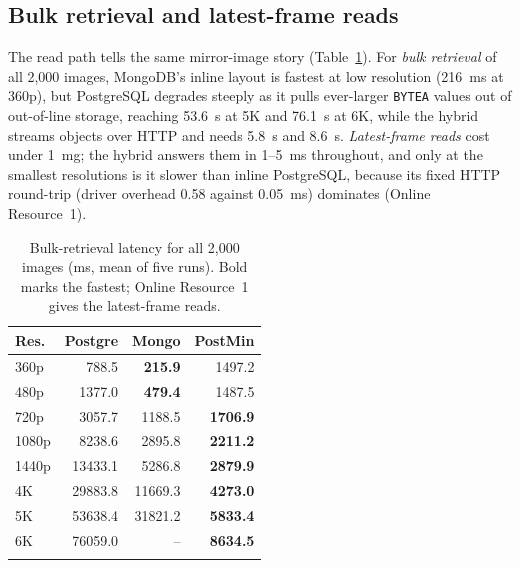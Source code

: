 \documentclass[pdflatex,sn-basic]{sn-jnl}%
\begin{document}
\subsection{Bulk retrieval and latest-frame reads}\label{subsec:retrieval}
The read path tells the same mirror-image story (Table~\ref{tab:read}). For \emph{bulk retrieval} of all 2{,}000 images, MongoDB's inline layout is fastest at low resolution (216~ms at 360p), but PostgreSQL degrades steeply as it pulls ever-larger \texttt{BYTEA} values out of out-of-line storage, reaching 53.6~s at 5K and 76.1~s at 6K, while the hybrid streams objects over HTTP and needs 5.8~s and 8.6~s. \emph{Latest-frame reads} cost under 1~mg; the hybrid answers them in 1--5~ms throughout, and only at the smallest resolutions is it slower than inline PostgreSQL, because its fixed HTTP round-trip (driver overhead 0.58 against 0.05~ms) dominates (Online Resource~1).

\begin{table}[htbp]
\caption{Bulk-retrieval latency for all 2{,}000 images (ms, mean of five runs). Bold marks the fastest; Online Resource~1 gives the latest-frame reads.}\label{tab:read}
\small
\begin{tabular}{@{}lrrr@{}}
\toprule
Res. & Postgre & Mongo & PostMin \\
\midrule
360p  & 788.5 & \textbf{215.9} & 1497.2 \\
480p  & 1377.0 & \textbf{479.4} & 1487.5 \\
720p  & 3057.7 & 1188.5 & \textbf{1706.9} \\
1080p & 8238.6 & 2895.8 & \textbf{2211.2} \\
1440p & 13433.1 & 5286.8 & \textbf{2879.9} \\
4K    & 29883.8 & 11669.3 & \textbf{4273.0} \\
5K    & 53638.4 & 31821.2 & \textbf{5833.4} \\
6K    & 76059.0 & -- & \textbf{8634.5} \\
\botrule
\end{tabular}
\end{table}
\end{document}
